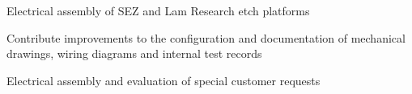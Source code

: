 \begin{tightemize}
    \item Electrical assembly of SEZ and Lam Research etch platforms
    \item Contribute improvements to the configuration and documentation of mechanical drawings, wiring diagrams and internal test records
    \item Electrical assembly and evaluation of special customer requests
\end{tightemize}